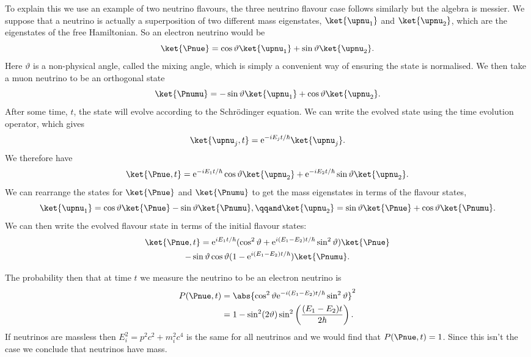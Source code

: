 \documentclass[fleqn]{NotesClass}
\newcommand{\e}{\mathrm{e}}
\begin{document}
    To explain this we use an example of two neutrino flavours, the three neutrino flavour case follows similarly but the algebra is messier.
    We suppose that a neutrino is actually a superposition of two different mass eigenstates, \(\ket{\upnu_1}\) and \(\ket{\upnu_2}\), which are the eigenstates of the free Hamiltonian.
    So an electron neutrino would be
    \begin{equation}
        \ket{\Pnue} = \cos\vartheta \ket{\upnu_1} + \sin\vartheta \ket{\upnu_2}.
    \end{equation}
    Here \(\vartheta\) is a non-physical angle, called the mixing angle, which is simply a convenient way of ensuring the state is normalised.
    We then take a muon neutrino to be an orthogonal state
    \begin{equation}
        \ket{\Pnumu} = -\sin\vartheta \ket{\upnu_1} + \cos\vartheta \ket{\upnu_2}.
    \end{equation}
    After some time, \(t\), the state will evolve according to the Schr\"odinger equation.
    We can write the evolved state using the time evolution operator, which gives
    \begin{equation}
        \ket{\upnu_j, t} = \e^{-iE_jt/\hbar}\ket{\upnu_j}.
    \end{equation}
    We therefore have
    \begin{equation}
        \ket{\Pnue, t} = \e^{-iE_1t/\hbar}\cos\vartheta\ket{\upnu_2} + \e^{-iE_2t/\hbar}\sin\vartheta\ket{\upnu_2}.
    \end{equation}
    We can rearrange the states for \(\ket{\Pnue}\) and \(\ket{\Pnumu}\) to get the mass eigenstates in terms of the flavour states,
    \begin{equation}
        \ket{\upnu_1} = \cos\vartheta \ket{\Pnue} - \sin\vartheta \ket{\Pnumu}, \qqand \ket{\upnu_2} = \sin\vartheta \ket{\Pnue} + \cos\vartheta \ket{\Pnumu}.
    \end{equation}
    We can then write the evolved flavour state in terms of the initial flavour states:
    \begin{multline}
        \ket{\Pnue, t} = \e^{iE_1t/\hbar}(\cos^2\vartheta + \e^{i(E_1 - E_2)t/\hbar}\sin^2\vartheta)\ket{\Pnue}\\
        - \sin\vartheta\cos\vartheta(1 - \e^{i(E_1 - E_2)t/\hbar})\ket{\Pnumu}.
    \end{multline}
    
    The probability then that at time \(t\) we measure the neutrino to be an electron neutrino is
    \begin{align}
        P(\Pnue, t) &= \abs{\cos^2\vartheta \e^{-i(E_1 - E_2)t/\hbar}\sin^2\vartheta}^2\\
        &= 1 - \sin^2(2\vartheta)\sin^2\left( \frac{(E_1 - E_2)t}{2\hbar} \right).
    \end{align}
    If neutrinos are massless then \(E_i^2 = p^2c^2 + m_i^2c^4\) is the same for all neutrinos and we would find that \(P(\Pnue, t) = 1\).
    Since this isn't the case we conclude that neutrinos have mass.
    
\end{document}
